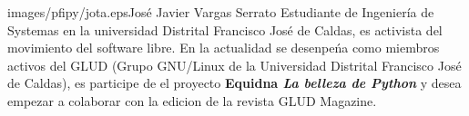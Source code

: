 \begin{multicols}{2}
\begin{bibliografia}
\end{bibliografia}


\begin{biografia}{images/pfipy/jota.eps}{José Javier Vargas Serrato} %
Estudiante de Ingeniería de Systemas en la universidad Distrital Francisco José de Caldas, 
es activista del movimiento del software libre.
En la actualidad se desenpeńa como miembros activos del GLUD (Grupo GNU/Linux de la Universidad Distrital
Francisco José de Caldas), es participe de el proyecto  \textbf{Equidna \textit{La belleza de Python}} y desea empezar a colaborar con la edicion de la revista GLUD 
Magazine.  
\end{biografia}

\end{multicols} %


\clearpage
\pagebreak

